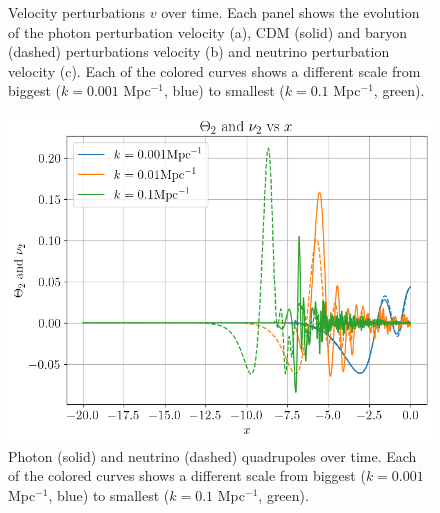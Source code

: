 \documentclass{aa}
\begin{document}
\begin{figure}[htp]
  \centering
  \quad
  \quad
\caption{Velocity perturbations $v$ over time. Each panel shows the evolution of the photon perturbation velocity (a), CDM (solid) and baryon (dashed) perturbations velocity (b) and neutrino perturbation velocity (c). Each of the colored curves shows a different scale from biggest ($k = 0.001$ Mpc$^{-1}$, blue) to smallest ($k=0.1$ Mpc$^{-1}$, green).}
\label{fig:velocities}
\end{figure}

\begin{figure}[ht]
    \centering
    \includegraphics[width=\hsize]{report/figures/Theta2_Nu2.png}
    \caption{Photon (solid) and neutrino (dashed) quadrupoles over time. Each of the colored curves shows a different scale from biggest ($k = 0.001$ Mpc$^{-1}$, blue) to smallest ($k=0.1$ Mpc$^{-1}$, green).}
    \label{fig:theta2-nu2}
\end{figure}
\end{document}
